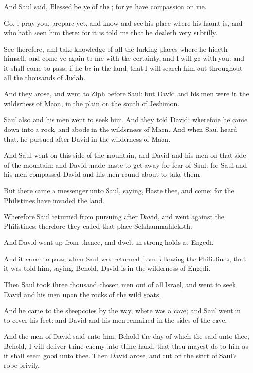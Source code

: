 \Verse And Saul said, Blessed be ye of the \LORD; for ye have compassion on me.

\Verse Go, I pray you, prepare yet, and know and see his place where his haunt is, and who hath seen him there: for it is told me that he dealeth very subtilly.

\Verse See therefore, and take knowledge of all the lurking places where he hideth himself, and come ye again to me with the certainty, and I will go with you: and it shall come to pass, if he be in the land, that I will search him out throughout all the thousands of Judah.

\Verse And they arose, and went to Ziph before Saul: but David and his men were in the wilderness of Maon, in the plain on the south of Jeshimon.

\Verse Saul also and his men went to seek him. And they told David; wherefore he came down into a rock, and abode in the wilderness of Maon. And when Saul heard that, he pursued after David in the wilderness of Maon.

\Verse And Saul went on this side of the mountain, and David and his men on that side of the mountain: and David made haste to get away for fear of Saul; for Saul and his men compassed David and his men round about to take them.

\Verse But there came a messenger unto Saul, saying, Haste thee, and come; for the Philistines have invaded the land.

\Verse Wherefore Saul returned from pursuing after David, and went against the Philistines: therefore they called that place Selahammahlekoth.

\Verse And David went up from thence, and dwelt in strong holds at Engedi.


\Chapter
\Verse And it came to pass, when Saul was returned from following the Philistines, that it was told him, saying, Behold, David is in the wilderness of Engedi.

\Verse Then Saul took three thousand chosen men out of all Israel, and went to seek David and his men upon the rocks of the wild goats.

\Verse And he came to the sheepcotes by the way, where was a cave; and Saul went in to cover his feet: and David and his men remained in the sides of the cave.

\Verse And the men of David said unto him, Behold the day of which the \LORD said unto thee, Behold, I will deliver thine enemy into thine hand, that thou mayest do to him as it shall seem good unto thee. Then David arose, and cut off the skirt of Saul's robe privily.

